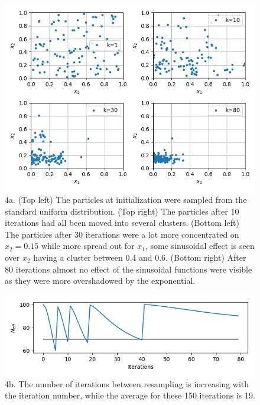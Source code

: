 \documentclass{article}
\begin{document}
\begin{figure}[h]
	\centering
	\includegraphics[width=.7\linewidth]{4_a}
	\caption{4a. (Top left) The particles at initialization were sampled from the standard uniform distribution. (Top right) The particles after 10 iterations had all been moved into several clusters. (Bottom left) The particles after 30 iterations were a lot more concentrated on $x_2=0.15$ while more spread out for $x_1$, some sinusoidal effect is seen over $x_2$ having a cluster between 0.4 and 0.6. (Bottom right) After 80 iterations almost no effect of the sinusoidal functions were visible as they were more overshadowed by the exponential.}
	\label{fig:4_a}
\end{figure}
\begin{figure}[h]
	\centering
	\includegraphics[width=.7\linewidth]{4_b}
	\caption{4b. The number of iterations between resampling is increasing with the iteration number, while the average for these 150 iterations is 19. }
	\label{fig:4_b}
\end{figure}
\end{document}
